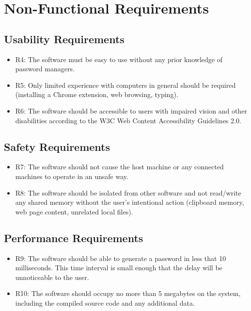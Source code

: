 \documentclass[12pt]{article}
\begin{document}
\section{Non-Functional Requirements}

\subsection{Usability Requirements}
\begin{itemize}
\item R4: The software must be easy to use without any prior knowledge of password managers.
\item R5: Only limited experience with computers in general should be required (installing a Chrome extension, web browsing, typing).\newline
\item R6: The software should be accessible to users with impaired vision and other disabilities according to the W3C Web Content Accessibility Guidelines 2.0.
\end{itemize}

\subsection{Safety Requirements}
\begin{itemize}
\item R7: The software should not cause the host machine or any connected machines to operate in an unsafe way. 
\item R8: The software should be isolated from other software and not read/write any shared memory without the user's intentional action (clipboard memory, web page content, unrelated local files).
\end{itemize}

\subsection{Performance Requirements}
\begin{itemize}
\item R9: The software should be able to generate a password in less that 10 milliseconds. This time interval is small enough that the delay will be unnoticeable to the user.
\item R10: The software should occupy no more than 5 megabytes on the system, including the compiled source code and any additional data.
\end{itemize}
\end{document}
